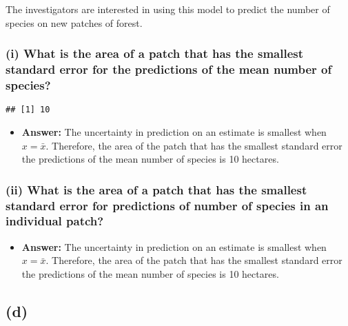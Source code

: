 \documentclass[]{article}
\newenvironment{Shaded}{\begin{snugshade}}{\end{snugshade}}
\newcommand{\KeywordTok}[1]{\textcolor[rgb]{0.13,0.29,0.53}{\textbf{#1}}}
\newcommand{\OperatorTok}[1]{\textcolor[rgb]{0.81,0.36,0.00}{\textbf{#1}}}
\newcommand{\NormalTok}[1]{#1}
\providecommand{\tightlist}{%
  \setlength{\itemsep}{0pt}\setlength{\parskip}{0pt}}
\begin{document}
The investigators are interested in using this model to predict the
number of species on new patches of forest.

\subsubsection{(i) What is the area of a patch that has the smallest
standard error for the predictions of the mean number of
species?}\label{i-what-is-the-area-of-a-patch-that-has-the-smallest-standard-error-for-the-predictions-of-the-mean-number-of-species}

\begin{Shaded}
\end{Shaded}

\begin{verbatim}
## [1] 10
\end{verbatim}

\begin{itemize}
\tightlist
\item
  \textbf{Answer:} The uncertainty in prediction on an estimate is
  smallest when \(x=\bar{x}\). Therefore, the area of the patch that has
  the smallest standard error the predictions of the mean number of
  species is 10 hectares.
\end{itemize}

\subsubsection{(ii) What is the area of a patch that has the smallest
standard error for predictions of number of species in an individual
patch?}\label{ii-what-is-the-area-of-a-patch-that-has-the-smallest-standard-error-for-predictions-of-number-of-species-in-an-individual-patch}

\begin{itemize}
\tightlist
\item
  \textbf{Answer:} The uncertainty in prediction on an estimate is
  smallest when \(x=\bar{x}\). Therefore, the area of the patch that has
  the smallest standard error the predictions of the mean number of
  species is 10 hectares.
\end{itemize}

\subsection{(d)}\label{d-3}
\end{document}
